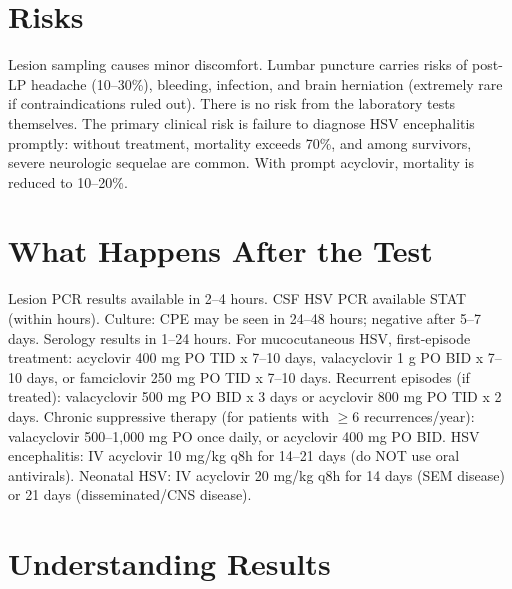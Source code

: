 \section*{Risks}
Lesion sampling causes minor discomfort. Lumbar puncture carries risks of post-LP headache (10--30\%), bleeding, infection, and brain herniation (extremely rare if contraindications ruled out). There is no risk from the laboratory tests themselves. The primary clinical risk is failure to diagnose HSV encephalitis promptly: without treatment, mortality exceeds 70\%, and among survivors, severe neurologic sequelae are common. With prompt acyclovir, mortality is reduced to 10--20\%.

\section*{What Happens After the Test}
Lesion PCR results available in 2--4 hours. CSF HSV PCR available STAT (within hours). Culture: CPE may be seen in 24--48 hours; negative after 5--7 days. Serology results in 1--24 hours. For mucocutaneous HSV, first-episode treatment: acyclovir 400 mg PO TID x 7--10 days, valacyclovir 1 g PO BID x 7--10 days, or famciclovir 250 mg PO TID x 7--10 days. Recurrent episodes (if treated): valacyclovir 500 mg PO BID x 3 days or acyclovir 800 mg PO TID x 2 days. Chronic suppressive therapy (for patients with $\geq$6 recurrences/year): valacyclovir 500--1,000 mg PO once daily, or acyclovir 400 mg PO BID. HSV encephalitis: IV acyclovir 10 mg/kg q8h for 14--21 days (do NOT use oral antivirals). Neonatal HSV: IV acyclovir 20 mg/kg q8h for 14 days (SEM disease) or 21 days (disseminated/CNS disease).

\section*{Understanding Results}

